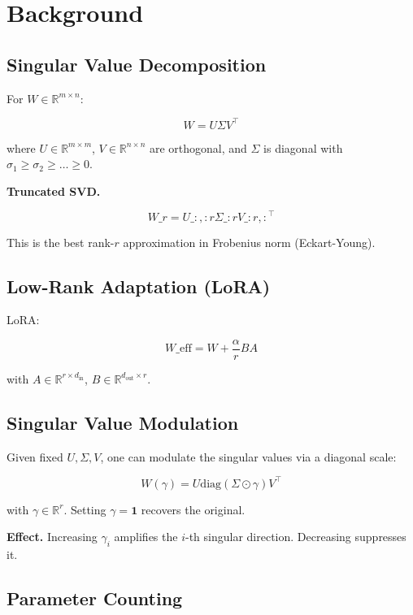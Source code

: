 
\section{Background}

\subsection{Singular Value Decomposition}

For $W \in \mathbb{R}^{m \times n}$:

\[
W = U \Sigma V^\top
\tag{3.1}
\]

where $U \in \mathbb{R}^{m \times m}$, $V \in \mathbb{R}^{n \times n}$ are 
orthogonal, and $\Sigma$ is diagonal with $\sigma_1 \geq \sigma_2 \geq \dots \geq 0$.

\textbf{Truncated SVD.}

\[
W\_r = U\_{:, :r} \Sigma\_{:r} V\_{:r, :}^\top
\tag{3.2}
\]

This is the best rank-$r$ approximation in Frobenius norm (Eckart-Young).

\subsection{Low-Rank Adaptation (LoRA)}

LoRA:

\[
W\_\text{eff} = W + \frac{\alpha}{r} BA
\tag{3.3}
\]

with $A \in \mathbb{R}^{r \times d_\text{in}}$, $B \in \mathbb{R}^{d_\text{out} \times r}$.

\subsection{Singular Value Modulation}

Given fixed $U, \Sigma, V$, one can modulate the singular values via a 
diagonal scale:

\[
W(\gamma) = U \text{diag}(\Sigma \odot \gamma) V^\top
\tag{3.4}
\]

with $\gamma \in \mathbb{R}^r$. Setting $\gamma = \mathbf{1}$ recovers the 
original.

\textbf{Effect.} Increasing $\gamma_i$ amplifies the $i$-th singular direction. 
Decreasing suppresses it.

\subsection{Parameter Counting}

